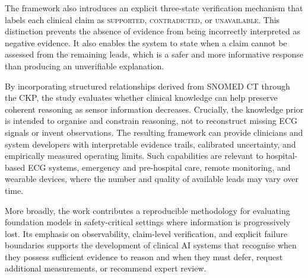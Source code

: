 \documentclass{ssnreview}
\begin{document}
The framework also introduces an explicit three-state verification mechanism that labels
each clinical claim as \textsc{supported}, \textsc{contradicted}, or \textsc{unavailable}.
This distinction prevents the absence of evidence from being incorrectly interpreted as
negative evidence. It also enables the system to state when a claim cannot be assessed from
the remaining leads, which is a safer and more informative response than producing an
unverifiable explanation.

By incorporating structured relationships derived from SNOMED CT through the CKP, the
study evaluates whether clinical knowledge can help preserve coherent reasoning as sensor
information decreases. Crucially, the knowledge prior is intended to organise and constrain
reasoning, not to reconstruct missing ECG signals or invent observations. The resulting
framework can provide clinicians and system developers with interpretable evidence trails,
calibrated uncertainty, and empirically measured operating limits. Such capabilities are
relevant to hospital-based ECG systems, emergency and pre-hospital care, remote monitoring,
and wearable devices, where the number and quality of available leads may vary over time.

More broadly, the work contributes a reproducible methodology for evaluating foundation
models in safety-critical settings where information is progressively lost. Its emphasis on
observability, claim-level verification, and explicit failure boundaries supports the
development of clinical AI systems that recognise when they possess sufficient evidence to
reason and when they must defer, request additional measurements, or recommend expert
review.
\end{document}

